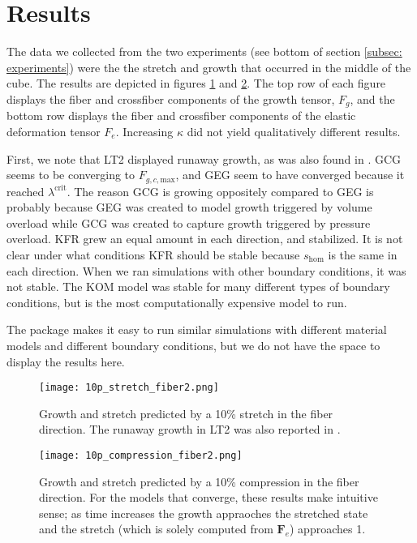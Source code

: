 \section{Results}
The data we collected from the two experiments (see bottom of section \ref{subsec: experiments}) were the the stretch and growth that occurred in the middle of the cube. The results are depicted in figures \ref{fig:10p_stretch} and \ref{fig:10p_compression}. The top row of each figure displays the fiber and crossfiber components of the growth tensor, $F_g$, and the bottom row displays the fiber and crossfiber components of the elastic deformation tensor $F_e$. Increasing $\kappa$ did not yield qualitatively different results. \par
First, we note that LT2 displayed runaway growth, as was also found in \citep{Witzenburg2018}. GCG seems to be converging to $F_{g,c,\mathrm{max}}$, and GEG seem to have converged because it reached $\lambda^\text{crit}$. The reason GCG is growing oppositely compared to GEG is probably because GEG was created to model growth triggered by volume overload while GCG was created to capture growth triggered by pressure overload. KFR grew an equal amount in each direction, and stabilized. It is not clear under what conditions KFR should be stable because $s_\mathrm{hom}$ is the same in each direction. When we ran simulations with other boundary conditions, it was not stable. The KOM model was stable for many different types of boundary conditions, but is the most computationally expensive model to run.\par 
The package makes it easy to run similar simulations with different material models and different boundary conditions, but we do not have the space to display the results here. \par
\begin{figure}[h]
    \centering
    \texttt{[image: 10p\_stretch\_fiber2.png]}
    \caption{Growth and stretch predicted by a 10\% stretch in the fiber direction. The runaway growth in LT2 was also reported in \citep{Taber1998}.}
    \label{fig:10p_stretch}
\end{figure}
\begin{figure}[h]
    \centering
    \texttt{[image: 10p\_compression\_fiber2.png]}
    \caption{Growth and stretch predicted by a 10\% compression in the fiber direction. For the models that converge, these results make intuitive sense; as time increases the growth appraoches the stretched state and the stretch (which is solely computed from $\mathbf{F}_e$) approaches 1.}
    \label{fig:10p_compression}
\end{figure}    
